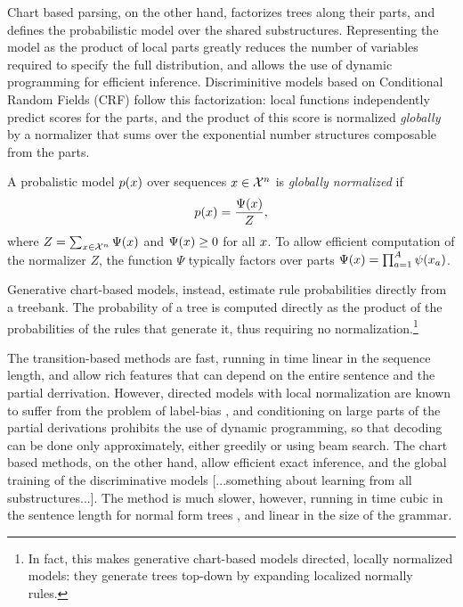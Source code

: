     Chart based parsing, on the other hand, factorizes trees along their parts, and defines the probabilistic model over the shared substructures. Representing the model as the product of local parts greatly reduces the number of variables required to specify the full distribution, and allows the use of dynamic programming for efficient inference. Discriminitive models based on Conditional Random Fields (CRF) \citep{lafferty2001crf} follow this factorization: local functions independently predict scores for the parts, and the product of this score is normalized \textit{globally} by a normalizer that sums over the exponential number structures composable from the parts.
    \begin{definition}{}
      A probalistic model $p(x)$ over sequences $x \in \mathcal{X}^n$ is \textit{globally normalized} if
      \begin{align*}
        p(x) = \frac{ \Psi( x ) }{ Z },
      \end{align*}
      where $Z  = \sum_{x \in \mathcal{X}^n} \Psi( x )$ and $\Psi (x ) \geq 0$ for all $x$. To allow efficient computation of the normalizer $Z$, the function $\Psi$ typically factors over parts $\Psi ( x ) = \prod_{a=1}^A \psi (x_a )$.
    \end{definition}
    Generative chart-based models, instead, estimate rule probabilities directly from a treebank. The probability of a tree is computed directly as the product of the probabilities of the rules that generate it, thus requiring no normalization.\footnote{In fact, this makes generative chart-based models directed, locally normalized models: they generate trees top-down by expanding localized normally rules.}

    The transition-based methods are fast, running in time linear in the sequence length, and allow rich features that can depend on the entire sentence and the partial derrivation. However, directed models with local normalization are known to suffer from the problem of label-bias \citep{lafferty2001crf}, and conditioning on large parts of the partial derivations prohibits the use of dynamic programming, so that decoding can be done only approximately, either greedily or using beam search. The chart based methods, on the other hand, allow efficient exact inference, and the global training of the discriminative models [...something about learning from all substructures...]. The method is much slower, however, running in time cubic in the sentence length for normal form trees , and linear in the size of the grammar.

